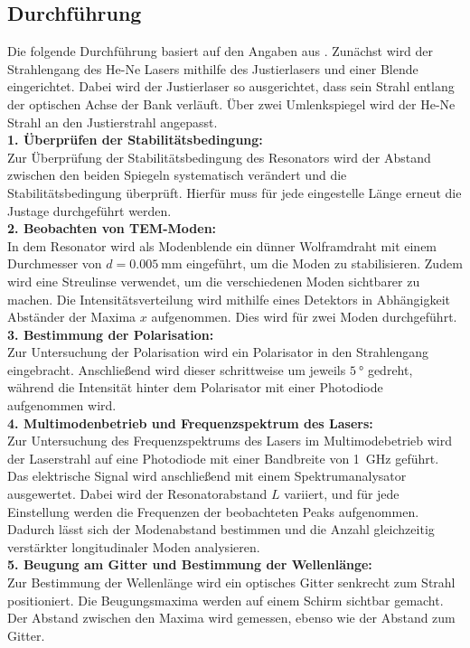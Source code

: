 \subsection{Durchführung}
\label{sec:Durchführung}
Die folgende Durchführung basiert auf den Angaben aus \cite{anleitungV61}.
Zunächst wird der Strahlengang des He-Ne Lasers mithilfe des Justierlasers und einer Blende eingerichtet. Dabei wird der Justierlaser so ausgerichtet, dass sein Strahl entlang der optischen Achse der Bank verläuft. Über zwei Umlenkspiegel wird der He-Ne Strahl an den Justierstrahl angepasst.\\
\textbf{1. Überprüfen der Stabilitätsbedingung:}\\
Zur Überprüfung der Stabilitätsbedingung des Resonators wird der Abstand zwischen den beiden Spiegeln systematisch verändert und die Stabilitätsbedingung überprüft.
Hierfür muss für jede eingestelle Länge erneut die Justage durchgeführt werden.\\
\textbf{2. Beobachten von TEM-Moden:}\\
In dem Resonator wird als Modenblende ein dünner Wolframdraht mit einem Durchmesser von $d=\SI{0.005}{\milli\meter}$  eingeführt, um die Moden zu stabilisieren.
Zudem wird eine Streulinse verwendet, um die verschiedenen Moden sichtbarer zu machen. 
Die Intensitätsverteilung wird mithilfe eines Detektors in Abhängigkeit Abständer der Maxima $x$ aufgenommen. 
Dies wird für zwei Moden durchgeführt.\\
\textbf{3. Bestimmung der Polarisation:}\\
Zur Untersuchung der Polarisation wird ein Polarisator in den Strahlengang eingebracht. Anschließend wird dieser schrittweise um jeweils $\SI{5}{\degree}$ gedreht, während die Intensität hinter dem Polarisator mit einer Photodiode aufgenommen wird.\\
\textbf{4. Multimodenbetrieb und Frequenzspektrum des Lasers:}\\
Zur Untersuchung des Frequenzspektrums des Lasers im Multimodebetrieb wird der Laserstrahl auf eine Photodiode mit einer Bandbreite von \SI{1}{\giga\hertz} geführt. 
Das elektrische Signal wird anschließend mit einem Spektrumanalysator ausgewertet. Dabei wird der Resonatorabstand $L$ variiert, und für jede Einstellung werden die Frequenzen der beobachteten Peaks aufgenommen. Dadurch lässt sich der Modenabstand bestimmen und die Anzahl gleichzeitig verstärkter longitudinaler Moden analysieren.\\
\textbf{5. Beugung am Gitter und Bestimmung der Wellenlänge:}\\
Zur Bestimmung der Wellenlänge wird ein optisches Gitter senkrecht zum Strahl positioniert. Die Beugungsmaxima werden auf einem Schirm sichtbar gemacht. Der Abstand zwischen den Maxima wird gemessen, ebenso wie der Abstand zum Gitter.\\